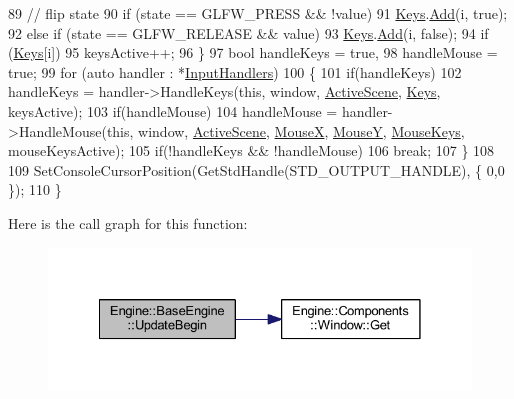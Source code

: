 \begin{DoxyCode}
89         \textcolor{comment}{// flip state}
90         \textcolor{keywordflow}{if} (state == GLFW\_PRESS && !value)
91             \mbox{\hyperlink{classEngine_1_1BaseEngine_a65321a97e83f0a6ee90df3efac2d3307}{Keys}}.\mbox{\hyperlink{classGeneric_1_1Dictionary_ae7cb006f801b21c172e8fbac8794fa99}{Add}}(i, \textcolor{keyword}{true});
92         \textcolor{keywordflow}{else} \textcolor{keywordflow}{if} (state == GLFW\_RELEASE && value)
93             \mbox{\hyperlink{classEngine_1_1BaseEngine_a65321a97e83f0a6ee90df3efac2d3307}{Keys}}.\mbox{\hyperlink{classGeneric_1_1Dictionary_ae7cb006f801b21c172e8fbac8794fa99}{Add}}(i, \textcolor{keyword}{false});
94         \textcolor{keywordflow}{if} (\mbox{\hyperlink{classEngine_1_1BaseEngine_a65321a97e83f0a6ee90df3efac2d3307}{Keys}}[i])
95             keysActive++;
96     \}
97     \textcolor{keywordtype}{bool} handleKeys = \textcolor{keyword}{true},
98          handleMouse = \textcolor{keyword}{true};
99     \textcolor{keywordflow}{for} (\textcolor{keyword}{auto} handler : *\mbox{\hyperlink{classEngine_1_1BaseEngine_a134fa082c5a64d62b76ddf926647e7cc}{InputHandlers}})
100     \{
101         \textcolor{keywordflow}{if}(handleKeys)
102             handleKeys = handler->HandleKeys(\textcolor{keyword}{this}, window, \mbox{\hyperlink{classEngine_1_1BaseEngine_adb3dbc839da9d821e08b18d8a221698d}{ActiveScene}}, 
      \mbox{\hyperlink{classEngine_1_1BaseEngine_a65321a97e83f0a6ee90df3efac2d3307}{Keys}}, keysActive);
103         \textcolor{keywordflow}{if}(handleMouse)
104             handleMouse = handler->HandleMouse(\textcolor{keyword}{this}, window, \mbox{\hyperlink{classEngine_1_1BaseEngine_adb3dbc839da9d821e08b18d8a221698d}{ActiveScene}}, 
      \mbox{\hyperlink{classEngine_1_1BaseEngine_a5fe085152ebe93346900407f6b41a034}{MouseX}}, \mbox{\hyperlink{classEngine_1_1BaseEngine_a143c9c32dbbdc70bf1546ffe275bf384}{MouseY}}, \mbox{\hyperlink{classEngine_1_1BaseEngine_a3ee2bdddb66d45b8c808ffd937ba9c50}{MouseKeys}}, mouseKeysActive);
105         \textcolor{keywordflow}{if}(!handleKeys && !handleMouse)
106             \textcolor{keywordflow}{break};
107     \}
108 
109     SetConsoleCursorPosition(GetStdHandle(STD\_OUTPUT\_HANDLE), \{ 0,0 \});
110 \}
\end{DoxyCode}
Here is the call graph for this function\+:
\nopagebreak
\begin{figure}[H]
\begin{center}
\leavevmode
\includegraphics[width=328pt]{classEngine_1_1BaseEngine_aace6be2a42d12b64fbd35f1acdb08408_cgraph}
\end{center}
\end{figure}
